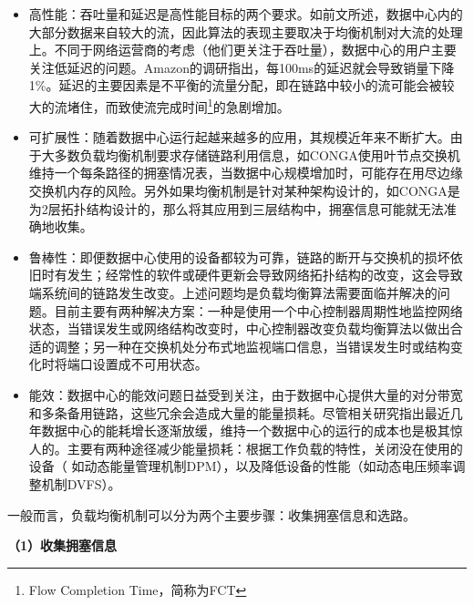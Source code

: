 \begin{itemize}
    \item 高性能：吞吐量和延迟是高性能目标的两个要求。如前文所述，数据中心内的大部分数据来自较大的流，因此算法的表现主要取决于均衡机制对大流的处理上。不同于网络运营商的考虑（他们更关注于吞吐量），数据中心的用户主要关注低延迟的问题。Amazon的调研指出，每100ms的延迟就会导致销量下降1\%。延迟的主要因素是不平衡的流量分配，即在链路中较小的流可能会被较大的流堵住，而致使流完成时间\footnote{Flow Completion Time，简称为FCT}的急剧增加。
    \item 可扩展性：随着数据中心运行起越来越多的应用，其规模近年来不断扩大。由于大多数负载均衡机制要求存储链路利用信息，如CONGA使用叶节点交换机维持一个每条路径的拥塞情况表，当数据中心规模增加时，可能存在用尽边缘交换机内存的风险。另外如果均衡机制是针对某种架构设计的，如CONGA是为2层拓扑结构设计的，那么将其应用到三层结构中，拥塞信息可能就无法准确地收集。
    \item 鲁棒性：即便数据中心使用的设备都较为可靠，链路的断开与交换机的损坏依旧时有发生；经常性的软件或硬件更新会导致网络拓扑结构的改变，这会导致端系统间的链路发生改变。上述问题均是负载均衡算法需要面临并解决的问题。目前主要有两种解决方案：一种是使用一个中心控制器周期性地监控网络状态，当错误发生或网络结构改变时，中心控制器改变负载均衡算法以做出合适的调整；另一种在交换机处分布式地监视端口信息，当错误发生时或结构变化时将端口设置成不可用状态。
    \item 能效：数据中心的能效问题日益受到关注，由于数据中心提供大量的对分带宽和多条备用链路，这些冗余会造成大量的能量损耗。尽管相关研究指出\cite{koomey2011growth}最近几年数据中心的能耗增长逐渐放缓，维持一个数据中心的运行的成本也是极其惊人的。主要有两种途径减少能量损耗：根据工作负载的特性，关闭没在使用的设备（
    如动态能量管理机制DPM），以及降低设备的性能（如动态电压频率调整机制DVFS）。
\end{itemize}

一般而言，负载均衡机制可以分为两个主要步骤：收集拥塞信息和选路。

\textbf{（1）收集拥塞信息}


